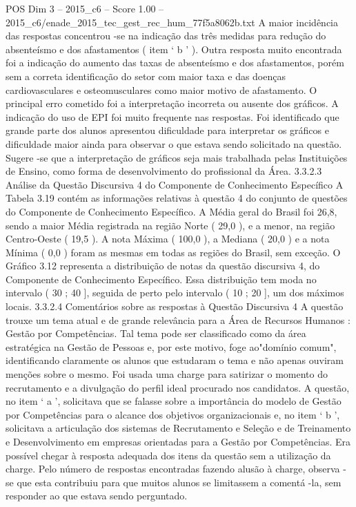 \begin{textsample}{POS Dim 3 – 2015\_c6 – Score 1.00 – 2015\_c6/enade\_2015\_tec\_gest\_rec\_hum\_77f5a8062b.txt}
A maior incidência das respostas concentrou -se na indicação das três medidas para redução do absenteísmo e dos afastamentos ( item ‘ b ’ ).
Outra resposta muito encontrada foi a indicação do aumento das taxas de absenteísmo e dos afastamentos, porém sem a correta identificação do setor com maior taxa e das doenças cardiovasculares e osteomusculares como maior motivo de afastamento.
O principal erro cometido foi a interpretação incorreta ou ausente dos gráficos.
A indicação do uso de EPI foi muito frequente nas respostas.
Foi identificado que grande parte dos alunos apresentou dificuldade para interpretar os gráficos e dificuldade maior ainda para observar o que estava sendo solicitado na questão.
Sugere -se que a interpretação de gráficos seja mais trabalhada pelas Instituições de Ensino, como forma de desenvolvimento do profissional da Área. 3.3.2.3 Análise da Questão Discursiva 4 do Componente de Conhecimento Específico A Tabela 3.19 contém as informações relativas à questão 4 do conjunto de questões do Componente de Conhecimento Específico.
A Média geral do Brasil foi 26,8, sendo a maior Média registrada na região Norte ( 29,0 ), e a menor, na região Centro-Oeste ( 19,5 ).
A nota Máxima ( 100,0 ), a Mediana ( 20,0 ) e a nota Mínima ( 0,0 ) foram as mesmas em todas as regiões do Brasil, sem exceção.
O Gráfico 3.12 representa a distribuição de notas da questão discursiva 4, do Componente de Conhecimento Específico.
Essa distribuição tem moda no intervalo ( 30 ; 40 ], seguida de perto pelo intervalo ( 10 ; 20 ], um dos máximos locais. 3.3.2.4 Comentários sobre as respostas à Questão Discursiva 4 A questão trouxe um tema atual e de grande relevância para a Área de Recursos Humanos : Gestão por Competências.
Tal tema pode ser classificado como da área estratégica na Gestão de Pessoas e, por este motivo, foge ao"domínio comum", identificando claramente os alunos que estudaram o tema e não apenas ouviram menções sobre o mesmo.
Foi usada uma charge para satirizar o momento do recrutamento e a divulgação do perfil ideal procurado nos candidatos.
A questão, no item ‘ a ’, solicitava que se falasse sobre a importância do modelo de Gestão por Competências para o alcance dos objetivos organizacionais e, no item ‘ b ’, solicitava a articulação dos sistemas de Recrutamento e Seleção e de Treinamento e Desenvolvimento em empresas orientadas para a Gestão por Competências.
Era possível chegar à resposta adequada dos itens da questão sem a utilização da charge.
Pelo número de respostas encontradas fazendo alusão à charge, observa -se que esta contribuiu para que muitos alunos se limitassem a comentá -la, sem responder ao que estava sendo perguntado.

\end{textsample}
